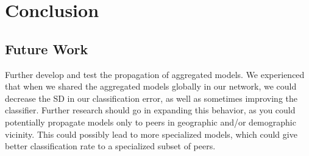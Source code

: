 
\chapter{Conclusion}



\section{Future Work}

Further develop and test the propagation of aggregated models. We experienced that when we shared the aggregated models globally in our network, we could decrease the SD in our classification error, as well as sometimes improving the classifier. Further research should go in expanding this behavior, as you could potentially propagate models only to peers in geographic and/or demographic vicinity. This could possibly lead to more specialized models, which could give better classification rate to a specialized subset of peers.  

\newpage
\listoftodos[Notes]

\cleardoublepage